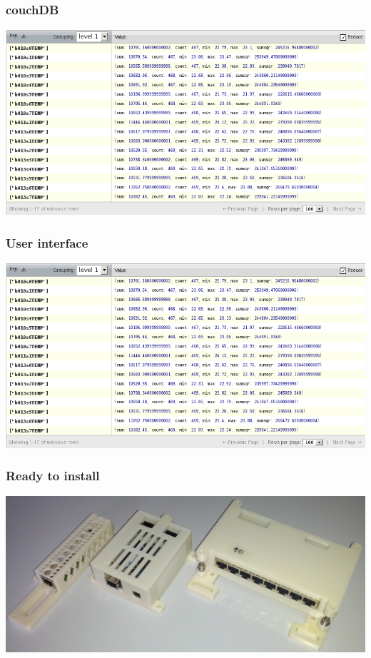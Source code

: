 \documentclass[t]{beamer}
\begin{document}
\begin{frame}[c]
    \frametitle{couchDB}
  \begin{center}
  	\includegraphics[width=0.9\linewidth]{img/db2.png}\\
  \vspace{0.5cm}
  \end{center}
\end{frame}
\begin{frame}[c]
    \frametitle{User interface}
  \begin{center}
  	\includegraphics[width=0.9\linewidth]{img/db2.png}\\
  \vspace{0.5cm}
  \end{center}
\end{frame}
\begin{frame}[c]
    \frametitle{Ready to install}
  \begin{center}
  	\includegraphics[width=0.9\linewidth]{img/pic/cases.jpg}\\
  \vspace{0.5cm}
  \end{center}
\end{frame}
\end{document}
